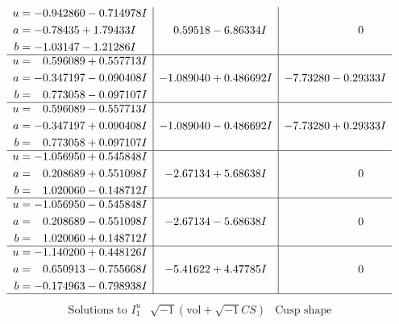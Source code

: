 \documentclass[1p]{elsarticle_modified}
\theoremstyle{definition}
\newcommand{\I}{\sqrt{-1}}
\begin{document}
$$\begin{array}{c|c|c}
\begin{aligned}
u &= -0.942860 - 0.714978 I \\
a &= -0.78435 + 1.79433 I \\
b &= -1.03147 - 1.21286 I\end{aligned}
 & \phantom{-}0.59518 - 6.86334 I & \phantom{-0.000000 } 0 \\ \hline\begin{aligned}
u &= \phantom{-}0.596089 + 0.557713 I \\
a &= -0.347197 - 0.090408 I \\
b &= \phantom{-}0.773058 - 0.097107 I\end{aligned}
 & -1.089040 + 0.486692 I & -7.73280 - 0.29333 I \\ \hline\begin{aligned}
u &= \phantom{-}0.596089 - 0.557713 I \\
a &= -0.347197 + 0.090408 I \\
b &= \phantom{-}0.773058 + 0.097107 I\end{aligned}
 & -1.089040 - 0.486692 I & -7.73280 + 0.29333 I \\ \hline\begin{aligned}
u &= -1.056950 + 0.545848 I \\
a &= \phantom{-}0.208689 + 0.551098 I \\
b &= \phantom{-}1.020060 - 0.148712 I\end{aligned}
 & -2.67134 + 5.68638 I & \phantom{-0.000000 } 0 \\ \hline\begin{aligned}
u &= -1.056950 - 0.545848 I \\
a &= \phantom{-}0.208689 - 0.551098 I \\
b &= \phantom{-}1.020060 + 0.148712 I\end{aligned}
 & -2.67134 - 5.68638 I & \phantom{-0.000000 } 0 \\ \hline\begin{aligned}
u &= -1.140200 + 0.448126 I \\
a &= \phantom{-}0.650913 - 0.755668 I \\
b &= -0.174963 - 0.798938 I\end{aligned}
 & -5.41622 + 4.47785 I & \phantom{-0.000000 } 0\\
 \hline 
 \end{array}$$\newpage$$\begin{array}{c|c|c}  
\text{Solutions to }I^u_{1}& \I (\text{vol} + \sqrt{-1}CS) & \text{Cusp shape}\\
 \hline 
\begin{aligned}

\end{aligned}
\end{array}$$
\end{document}
